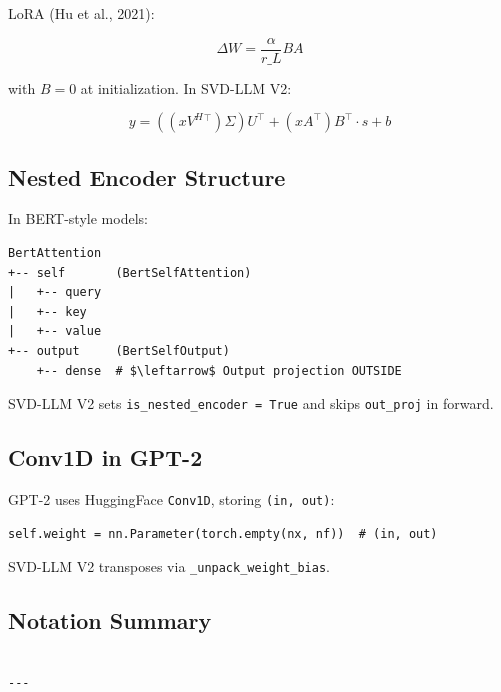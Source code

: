LoRA (Hu et al., 2021):

\[
\Delta W = \frac{\alpha}{r\_L} B A
\tag{3.11}
\]

with $B = 0$ at initialization. In SVD-LLM V2:

\[
y = ((x V^H{}^\top) \Sigma) U^\top + (x A^\top) B^\top \cdot s + b
\tag{3.12}
\]

\subsection{Nested Encoder Structure}

In BERT-style models:

\begin{lstlisting}
BertAttention
+-- self       (BertSelfAttention)
|   +-- query
|   +-- key
|   +-- value
+-- output     (BertSelfOutput)
    +-- dense  # $\leftarrow$ Output projection OUTSIDE
\end{lstlisting}

SVD-LLM V2 sets \texttt{is\_nested\_encoder = True} and skips \texttt{out\_proj} in forward.

\subsection{Conv1D in GPT-2}

GPT-2 uses HuggingFace \texttt{Conv1D}, storing \texttt{(in, out)}:

\begin{lstlisting}
self.weight = nn.Parameter(torch.empty(nx, nf))  # (in, out)
\end{lstlisting}

SVD-LLM V2 transposes via \texttt{\_unpack\_weight\_bias}.

\subsection{Notation Summary}

\begin{lstlisting}

---
\end{lstlisting}